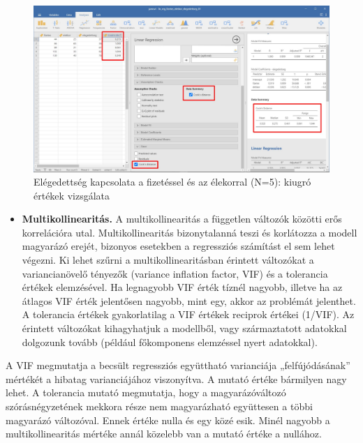 \documentclass[
  letterpaper,
]{krantz}
\providecommand{\tightlist}{%
  \setlength{\itemsep}{0pt}\setlength{\parskip}{0pt}}\usepackage{longtable,booktabs,array}
\begin{document}
\begin{figure}

{\centering \includegraphics{./images/lin_reg_fizetes_eletkor_elegedettseg_01_kep_06.jpg}

}

\caption{Elégedettség kapcsolata a fizetéssel és az élekorral (N=5):
kiugró értékek vizsgálata}

\end{figure}

\begin{itemize}
\tightlist
\item
  \textbf{Multikollinearitás.} A multikollinearitás a független változók
  közötti erős korrelációra utal. Multikollinearitás bizonytalanná teszi
  és korlátozza a modell magyarázó erejét, bizonyos esetekben a
  regressziós számítást el sem lehet végezni. Ki lehet szűrni a
  multikollinearitásban érintett változókat a variancianövelő tényezők
  (variance inflation factor, VIF) és a tolerancia értékek elemzésével.
  Ha legnagyobb VIF érték tíznél nagyobb, illetve ha az átlagos VIF
  érték jelentősen nagyobb, mint egy, akkor az problémát jelenthet. A
  tolerancia értékek gyakorlatilag a VIF értékek reciprok értékei
  (1/VIF). Az érintett változókat kihagyhatjuk a modellből, vagy
  származtatott adatokkal dolgozunk tovább (például főkomponens
  elemzéssel nyert adatokkal).
\end{itemize}

A VIF megmutatja a becsült regressziós együttható varianciája
„felfújódásának'' mértékét a hibatag varianciájához viszonyítva. A
mutató értéke bármilyen nagy lehet. A tolerancia mutató megmutatja, hogy
a magyarázóváltozó szórásnégyzetének mekkora része nem magyarázható
együttesen a többi magyarázó változóval. Ennek értéke nulla és egy közé
esik. Minél nagyobb a multikollinearitás mértéke annál közelebb van a
mutató értéke a nullához.
\end{document}
